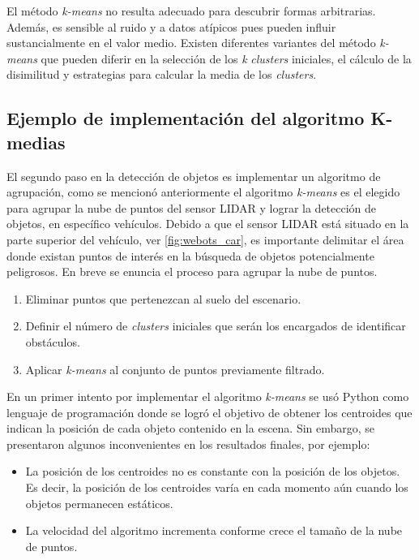 El método \textit{k-means} no resulta adecuado para descubrir formas arbitrarias. Además, es sensible al ruido y a datos atípicos pues pueden influir sustancialmente en el valor medio. Existen diferentes variantes del método \textit{k-means} que pueden diferir en la selección de los \textit{k} \textit{clusters} iniciales, el cálculo de la disimilitud y estrategias para calcular la media de los \textit{clusters}.

\subsection{Ejemplo de implementación del algoritmo K-medias} \label{sub:ejemplo_de_implementación_del_algoritmo_K-medias}

El segundo paso en la detección de objetos es implementar un algoritmo de agrupación, como se mencionó anteriormente el algoritmo \textit{k-means} es el elegido para agrupar la nube de puntos del sensor LIDAR y lograr la detección de objetos, en específico vehículos. Debido a que el sensor LIDAR está situado en la parte superior del vehículo, ver \ref{fig:webots_car}, es importante delimitar el área donde existan puntos de interés en la búsqueda de objetos potencialmente peligrosos. En breve se enuncia el proceso para agrupar la nube de puntos.   
\begin{enumerate}
    \item Eliminar puntos que pertenezcan al suelo del escenario.
    \item Definir el número de \textit{clusters} iniciales que serán los encargados de identificar obstáculos.
    \item Aplicar \textit{k-means} al conjunto de puntos previamente filtrado.
\end{enumerate}

En un primer intento por implementar el algoritmo \textit{k-means} se usó Python como lenguaje de programación donde se logró el objetivo de obtener los centroides que indican la posición de cada objeto contenido en la escena. Sin embargo, se presentaron algunos inconvenientes en los resultados finales, por ejemplo: 
\begin{itemize}
    \item La posición de los centroides no es constante con la posición de los objetos. Es decir, la posición de los centroides  varía en cada momento aún cuando los objetos permanecen estáticos.
    \item La velocidad del algoritmo incrementa conforme crece el tamaño de la nube de puntos.
\end{itemize}


